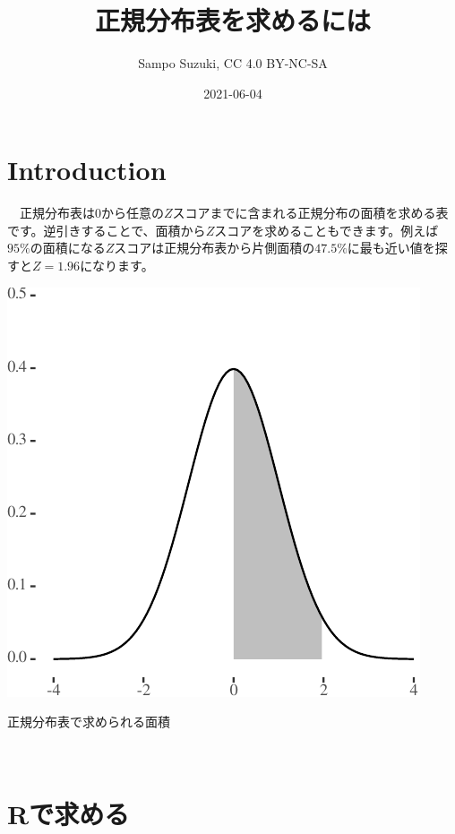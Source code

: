 \documentclass[]{tufte-handout}
\title[正規分布表を求めるには]{正規分布表を求めるには}
\author{Sampo Suzuki, CC 4.0 BY-NC-SA}
\date{2021-06-04}
\begin{document}
\maketitle




\hypertarget{introduction}{%
\section{\texorpdfstring{\textbf{Introduction}}{Introduction}}\label{introduction}}

　正規分布表は\(0\)から任意の\(Z\)スコアまでに含まれる正規分布の面積を求める表です。逆引きすることで、面積から\(Z\)スコアを求めることもできます。例えば\(95\%\)の面積になる\(Z\)スコアは正規分布表から片側面積の\(47.5\%\)に最も近い値を探すと\(Z = 1.96\)になります。

\begin{marginfigure}

{\centering \includegraphics{NormTable_files/figure-latex/unnamed-chunk-1-1} 

}

\caption[正規分布表で求められる面積]{正規分布表で求められる面積}\label{fig:unnamed-chunk-1}
\end{marginfigure}

　

\hypertarget{rux3067ux6c42ux3081ux308b}{%
\section{\texorpdfstring{\textbf{Rで求める}}{Rで求める}}\label{rux3067ux6c42ux3081ux308b}}
\end{document}
